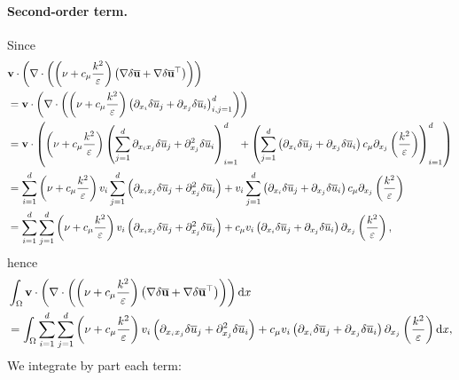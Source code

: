 \documentclass[oneside,11pt]{book}
\numberwithin{equation}{section}
\begin{document}
\paragraph*{Second-order term.} Since
\begin{align*}
    &{\bf v}\cdot\left(\nabla\cdot\left(\left(\nu + c_\mu\frac{k^2}{\varepsilon}\right)\left(\nabla\delta\overline{\bf u} + \nabla\delta\overline{\bf u}^\top\right)\right)\right)\\
    &= {\bf v}\cdot\left(\nabla\cdot\left(\left(\nu + c_\mu\frac{k^2}{\varepsilon}\right)\left(\partial_{x_i}\delta\overline{u}_j + \partial_{x_j}\delta\overline{u}_i\right)_{i,j=1}^d\right)\right)\\
    &= {\bf v}\cdot\left(\left(\nu + c_\mu\frac{k^2}{\varepsilon}\right)\left(\sum_{j=1}^d \partial_{x_ix_j}\delta\overline{u}_j + \partial_{x_j}^2\delta\overline{u}_i\right)_{i=1}^d + \left(\sum_{j=1}^d \left(\partial_{x_i}\delta\overline{u}_j + \partial_{x_j}\delta\overline{u}_i\right)c_\mu\partial_{x_j}\left(\frac{k^2}{\varepsilon}\right)\right)_{i=1}^d\right)\\
    &= \sum_{i=1}^d \left(\nu + c_\mu\frac{k^2}{\varepsilon}\right)v_i\sum_{j=1}^d\left(\partial_{x_ix_j}\delta\overline{u}_j + \partial_{x_j}^2\delta\overline{u}_i\right) + v_i\sum_{j=1}^d \left(\partial_{x_i}\delta\overline{u}_j + \partial_{x_j}\delta\overline{u}_i\right)c_\mu\partial_{x_j}\left(\frac{k^2}{\varepsilon}\right)\\
    &= \sum_{i=1}^d\sum_{j=1}^d \left(\nu + c_\mu\frac{k^2}{\varepsilon}\right)v_i\left(\partial_{x_ix_j}\delta\overline{u}_j + \partial_{x_j}^2\delta\overline{u}_i\right) + c_\mu v_i\left(\partial_{x_i}\delta\overline{u}_j + \partial_{x_j}\delta\overline{u}_i\right)\partial_{x_j}\left(\frac{k^2}{\varepsilon}\right),
\end{align*}
hence
\begin{align*}
    &\int_\Omega {\bf v}\cdot\left(\nabla\cdot\left(\left(\nu + c_\mu\frac{k^2}{\varepsilon}\right)\left(\nabla\delta\overline{\bf u} + \nabla\delta\overline{\bf u}^\top\right)\right)\right){\rm d}x\\
    &= \int_\Omega \sum_{i=1}^d\sum_{j=1}^d \left(\nu + c_\mu\frac{k^2}{\varepsilon}\right)v_i\left(\partial_{x_ix_j}\delta\overline{u}_j + \partial_{x_j}^2\delta\overline{u}_i\right) + c_\mu v_i\left(\partial_{x_i}\delta\overline{u}_j + \partial_{x_j}\delta\overline{u}_i\right)\partial_{x_j}\left(\frac{k^2}{\varepsilon}\right){\rm d}x,
\end{align*}
We integrate by part each term:
\end{document}
